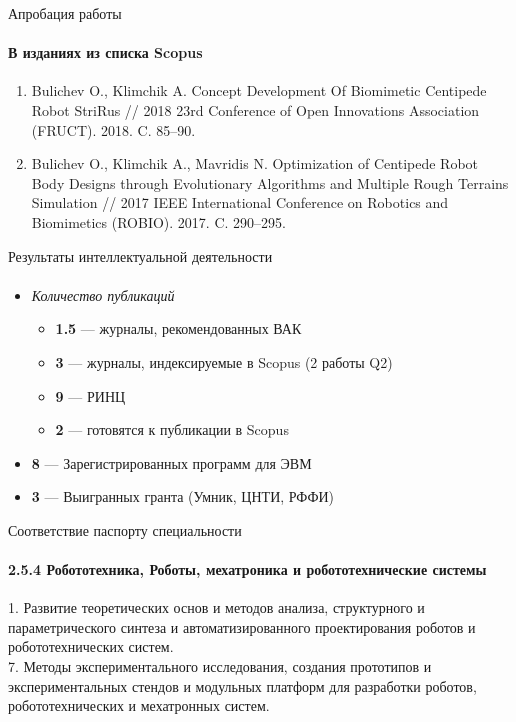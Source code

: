 \documentclass[aspectratio=169,xcolor=table]{beamer}
\newcommand{\fbckg}[1]{\usebackgroundtemplate{\texttt{[image: \#1]}}}%
\begin{document}
\begin{frame}[t]{Апробация работы}
    \framesubtitle{В изданиях из списка Scopus}
        \begin{enumerate}
            \item Bulichev O., Klimchik A. Concept Development Of Biomimetic Centipede Robot StriRus // 2018 23rd Conference of Open Innovations Association (FRUCT). 2018. C. 85–90.
            \item Bulichev O., Klimchik A., Mavridis N. Optimization of Centipede Robot Body Designs through Evolutionary Algorithms and Multiple Rough Terrains Simulation // 2017 IEEE International Conference on Robotics and Biomimetics (ROBIO). 2017. C. 290–295.
        \end{enumerate}
    \end{frame}

\begin{frame}[t]{Результаты интеллектуальной деятельности}
\framesubtitle{}
\large
\begin{itemize}
    \item \textit{Количество публикаций} 
    \begin{itemize}
        \large
        \item \textbf{1.5} --- журналы, рекомендованных ВАК
        \item \textbf{3} --- журналы, индексируемые в Scopus (2 работы Q2)
        \item \textbf{9} --- РИНЦ
        \item \textbf{2} --- готовятся к публикации в Scopus
    \end{itemize}
    \item \textbf{8} --- Зарегистрированных программ для ЭВМ
    \item \textbf{3} --- Выигранных гранта (Умник, ЦНТИ, РФФИ)
\end{itemize}
\end{frame}

\begin{frame}[t]{Соответствие паспорту специальности}
\framesubtitle{2.5.4 Робототехника, Роботы, мехатроника и
робототехнические системы}
    1. Развитие теоретических основ и методов анализа, структурного и параметрического синтеза и автоматизированного проектирования роботов и робототехнических систем. \\
    7. Методы экспериментального исследования, создания прототипов и
    экспериментальных стендов и модульных платформ для разработки роботов, робототехнических и мехатронных систем. \\
\end{frame}

\end{document}
